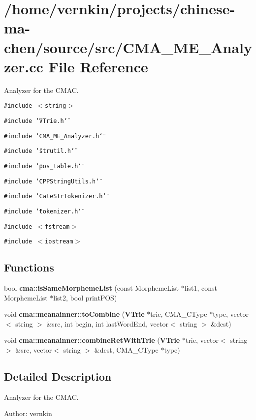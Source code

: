 \section{/home/vernkin/projects/chinese-ma-chen/source/src/CMA\_\-ME\_\-Analyzer.cc File Reference}
\label{CMA__ME__Analyzer_8cc}
Analyzer for the CMAC.  


{\tt \#include $<$string$>$}\par
{\tt \#include \char`\"{}VTrie.h\char`\"{}}\par
{\tt \#include \char`\"{}CMA\_\-ME\_\-Analyzer.h\char`\"{}}\par
{\tt \#include \char`\"{}strutil.h\char`\"{}}\par
{\tt \#include \char`\"{}pos\_\-table.h\char`\"{}}\par
{\tt \#include \char`\"{}CPPStringUtils.h\char`\"{}}\par
{\tt \#include \char`\"{}CateStrTokenizer.h\char`\"{}}\par
{\tt \#include \char`\"{}tokenizer.h\char`\"{}}\par
{\tt \#include $<$fstream$>$}\par
{\tt \#include $<$iostream$>$}\par
\subsection*{Functions}
\begin{CompactItemize}
\item 
bool {\bf cma::isSameMorphemeList} (const MorphemeList $\ast$list1, const MorphemeList $\ast$list2, bool printPOS)
\item 
void {\bf cma::meanainner::toCombine} ({\bf VTrie} $\ast$trie, CMA\_\-CType $\ast$type, vector$<$ string $>$ \&src, int begin, int lastWordEnd, vector$<$ string $>$ \&dest)
\item 
void \textbf{cma::meanainner::combineRetWithTrie} ({\bf VTrie} $\ast$trie, vector$<$ string $>$ \&src, vector$<$ string $>$ \&dest, CMA\_\-CType $\ast$type)\label{namespacecma_1_1meanainner_aba0478eb017501ee85814fcbc0486fa}

\end{CompactItemize}


\subsection{Detailed Description}
Analyzer for the CMAC. 

\begin{Desc}
\item[Author:]vernkin \end{Desc}
